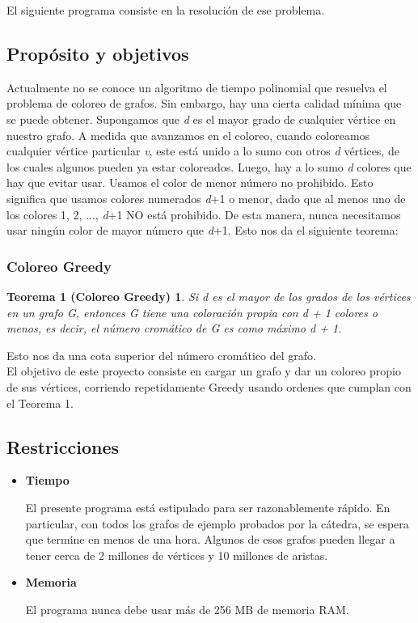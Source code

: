 \documentclass[11pt,a4paper]{article}
\theoremstyle{plain}
\begin{document}
 El siguiente programa consiste en la resolución de ese problema.

	\subsection{Propósito y objetivos}

Actualmente no se conoce un algoritmo de tiempo polinomial que resuelva el problema de coloreo de grafos. Sin embargo, hay una cierta calidad mínima que se puede obtener. Supongamos que \emph{d} es el mayor grado de cualquier vértice en nuestro grafo. A medida que avanzamos en el coloreo, cuando coloreamos cualquier vértice particular \emph{v}, este está unido a lo sumo con otros \emph{d} vértices, de los cuales algunos pueden ya estar coloreados. Luego, hay a lo sumo \emph{d} colores que hay que evitar usar. Usamos el color de menor número no prohibido. Esto significa que usamos colores numerados \emph{d}+1 o menor, dado que al menos uno de los colores 1, 2, ..., \emph{d}+1 NO está prohibido. De esta manera, nunca necesitamos usar ningún color de mayor número que \emph{d}+1. Esto nos da el siguiente teorema:

\subsubsection{Coloreo Greedy}
\newtheorem*{Teorema*}{Teorema 1 (Coloreo Greedy)}

\begin{Teorema*}
Si d es el mayor de los grados de los vértices en un grafo G, entonces G tiene una coloración propia con d + 1 colores o menos, es decir, el número cromático de G es como máximo d + 1.
\end{Teorema*}

 Esto nos da una cota superior del número cromático del grafo\cite {4}.\\

El objetivo de este proyecto consiste en cargar un grafo y dar un coloreo propio de sus vértices, corriendo repetidamente Greedy usando ordenes que cumplan con el Teorema 1.

	\subsection{Restricciones}

\begin{itemize}

\item\textbf{{Tiempo}}

El presente programa está estipulado para ser razonablemente rápido. En particular, con todos los grafos de ejemplo probados por la cátedra\cite{5}\cite{6}, se espera que termine en menos de una hora. Algunos de esos grafos pueden llegar a tener cerca de 2 millones de vértices y 10 millones de aristas.

\item\textbf{{Memoria}}

El programa nunca debe usar más de 256 MB de memoria RAM.

\end{itemize}
\end{document}
